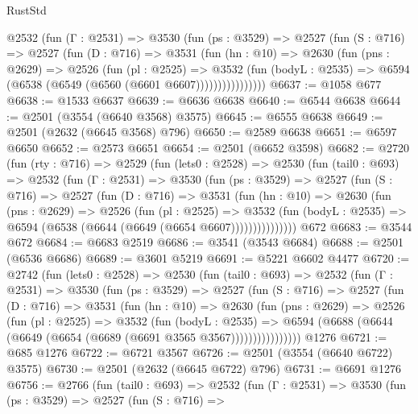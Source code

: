 \begin{lexlean}{RustStd}
\begin{coremodule}
          @2532
            (fun (Γ : @2531) =>
            @3530
              (fun (ps : @3529) =>
              @2527
                (fun (S : @716) =>
                @2527
                  (fun (D : @716) =>
                  @3531
                    (fun (hn : @10) =>
                    @2630
                      (fun (pns : @2629) =>
                      @2526
                        (fun (pl : @2525) =>
                        @3532
                          (fun (bodyL : @2535) =>
                          @6594 (@6538 (@6549 (@6560 (@6601 @6607))))))))))))))))
@6637 := @1058 @677
@6638 := @1533 @6637
@6639 := @6636 @6638
@6640 := @6544 @6638
@6644 := @2501 (@3554 (@6640 @3568) @3575)
@6645 := @6555 @6638
@6649 := @2501 (@2632 (@6645 @3568) @796)
@6650 := @2589 @6638
@6651 := @6597 @6650
@6652 := @2573 @6651
@6654 := @2501 (@6652 @3598)
@6682 := @2720
    (fun (rty : @716) =>
    @2529
      (fun (lets0 : @2528) =>
      @2530
        (fun (tail0 : @693) =>
        @2532
          (fun (Γ : @2531) =>
          @3530
            (fun (ps : @3529) =>
            @2527
              (fun (S : @716) =>
              @2527
                (fun (D : @716) =>
                @3531
                  (fun (hn : @10) =>
                  @2630
                    (fun (pns : @2629) =>
                    @2526
                      (fun (pl : @2525) =>
                      @3532
                        (fun (bodyL : @2535) =>
                        @6594 (@6538 (@6644 (@6649 (@6654 @6607)))))))))))))))
    @672
@6683 := @3544 @672
@6684 := @6683 @2519
@6686 := @3541 (@3543 @6684)
@6688 := @2501 (@6536 @6686)
@6689 := @3601 @5219
@6691 := @5221 @6602 @4477
@6720 := @2742
    (fun (lets0 : @2528) =>
    @2530
      (fun (tail0 : @693) =>
      @2532
        (fun (Γ : @2531) =>
        @3530
          (fun (ps : @3529) =>
          @2527
            (fun (S : @716) =>
            @2527
              (fun (D : @716) =>
              @3531
                (fun (hn : @10) =>
                @2630
                  (fun (pns : @2629) =>
                  @2526
                    (fun (pl : @2525) =>
                    @3532
                      (fun (bodyL : @2535) =>
                      @6594 (@6688 (@6644 (@6649 (@6654 (@6689 (@6691 @3565 @3567))))))))))))))))
    @1276
@6721 := @685 @1276
@6722 := @6721 @3567
@6726 := @2501 (@3554 (@6640 @6722) @3575)
@6730 := @2501 (@2632 (@6645 @6722) @796)
@6731 := @6691 @1276
@6756 := @2766
    (fun (tail0 : @693) =>
    @2532
      (fun (Γ : @2531) =>
      @3530
        (fun (ps : @3529) =>
        @2527
          (fun (S : @716) =>

\end{coremodule}
\end{lexlean}
